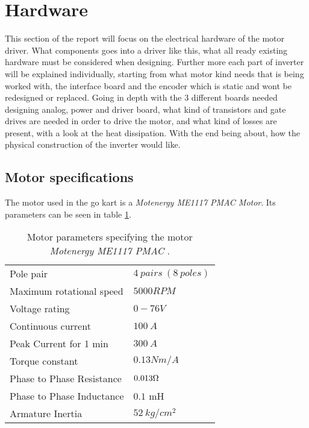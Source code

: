 \section{Hardware}
\label{sec:hardware}
This section of the report will focus on the electrical hardware of the motor driver. What components goes into a driver like this, what all ready existing hardware must be considered when designing. Further more each part of inverter will be explained individually, starting from what motor kind needs that is being worked with, the interface board and the encoder which is static and wont be redesigned or replaced. Going in depth with the 3 different boards needed designing analog, power and driver board, what kind of transistors and gate drives are needed in order to drive the motor, and what kind of losses are present, with a look at the heat dissipation. With the end being about, how the physical construction of the inverter would like.


\subsection{Motor specifications}
The motor used in the go kart is a \textit{Motenergy ME1117 PMAC Motor}. Its parameters can be seen in table \ref{Motor_parameters_list}. 

\begin{table} [H]
    \centering
    \begin{tabular}{|l|l|} \cline{1-2}
        Pole pair                   & $4\ pairs\ (8\ poles)$        \\ \cline{1-2}
        Maximum rotational speed    & $5000 RPM$                    \\ \cline{1-2}
        Voltage rating              & $0-76 V$                      \\ \cline{1-2}
        Continuous current          & $100\ A$                      \\ \cline{1-2}
        Peak Current for 1 min      & $300\ A$                      \\ \cline{1-2}
        Torque constant             & $0.13 Nm/A$                   \\ \cline{1-2}
        Phase to Phase Resistance   & $0.013\ohm$                   \\ \cline{1-2}
        Phase to Phase Inductance   & $0.1$ mH                      \\ \cline{1-2}
        Armature Inertia            & $52\ kg/cm^2$                 \\ \cline{1-2}
    \end{tabular} \\
    \caption{Motor parameters specifying the motor \textit{Motenergy ME1117 PMAC} \cite{Motor_Parameters}.}
    \label{Motor_parameters_list}
\end{table} 


